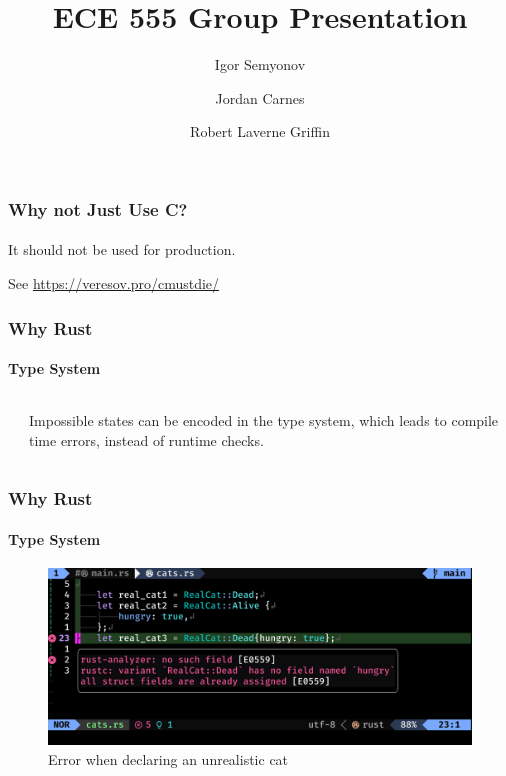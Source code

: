 \documentclass[aspectratio=169]{beamer}
\title[Short Title]{
    ECE 555 Group Presentation
}
\author{
	Igor Semyonov
	\and Jordan Carnes
	\and Robert Laverne Griffin
}
\institute{
    George Macon University, Department of Electrical and Computer Engineering
}
\begin{document}
\begin{frame}
	\vspace{-1.8cm}
	\titlepage
\end{frame}

\begin{frame}
	\frametitle{Why not Just Use C?}
	\framesubtitle{}

	It should not be used for production.

	See \url{https://veresov.pro/cmustdie/}
\end{frame}

\begin{frame}
	\frametitle{Why Rust}
	\framesubtitle{Type System}

	\begin{columns}
		\begin{column}{0.4\textwidth}
			
		\end{column}
		\begin{column}{0.5\textwidth}
			Impossible states can be encoded in the type system, which leads to compile time errors, instead of runtime checks.
			
		\end{column}
	\end{columns}
\end{frame}

\begin{frame}
	\frametitle{Why Rust}
	\framesubtitle{Type System}
	\begin{figure}[ht]
		\centering
		\includegraphics[width=\textwidth]{./figures/real-cat.png}
		\caption{Error when declaring an unrealistic cat}
	\end{figure}
\end{frame}
\end{document}
